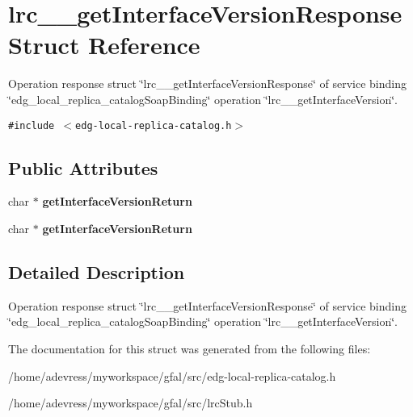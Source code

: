 \section{lrc\_\-\_\-get\-Interface\-Version\-Response Struct Reference}
\label{structlrc____getInterfaceVersionResponse}
Operation response struct \char`\"{}lrc\_\-\_\-get\-Interface\-Version\-Response\char`\"{} of service binding \char`\"{}edg\_\-local\_\-replica\_\-catalog\-Soap\-Binding\char`\"{} operation \char`\"{}lrc\_\-\_\-get\-Interface\-Version\char`\"{}.  


{\tt \#include $<$edg-local-replica-catalog.h$>$}

\subsection*{Public Attributes}
\begin{CompactItemize}
\item 
char $\ast$ \textbf{get\-Interface\-Version\-Return}\label{structlrc____getInterfaceVersionResponse_8d56d419326406696223406d50225c0f}

\item 
char $\ast$ \textbf{get\-Interface\-Version\-Return}\label{structlrc____getInterfaceVersionResponse_8d56d419326406696223406d50225c0f}

\end{CompactItemize}


\subsection{Detailed Description}
Operation response struct \char`\"{}lrc\_\-\_\-get\-Interface\-Version\-Response\char`\"{} of service binding \char`\"{}edg\_\-local\_\-replica\_\-catalog\-Soap\-Binding\char`\"{} operation \char`\"{}lrc\_\-\_\-get\-Interface\-Version\char`\"{}. 



The documentation for this struct was generated from the following files:\begin{CompactItemize}
\item 
/home/adevress/myworkspace/gfal/src/edg-local-replica-catalog.h\item 
/home/adevress/myworkspace/gfal/src/lrc\-Stub.h\end{CompactItemize}
